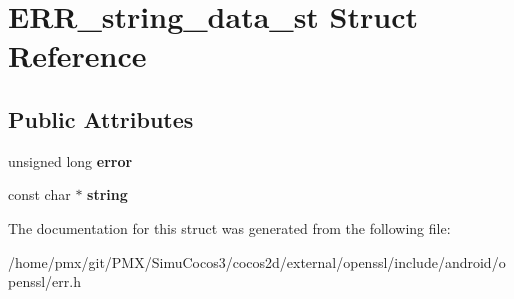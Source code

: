 \hypertarget{structERR__string__data__st}{}\section{E\+R\+R\+\_\+string\+\_\+data\+\_\+st Struct Reference}
\label{structERR__string__data__st}
\subsection*{Public Attributes}
\begin{DoxyCompactItemize}
\item 
\mbox{\label{structERR__string__data__st_a31cec2470a4a78675d42e43bca29eb73}} 
unsigned long {\bfseries error}
\item 
\mbox{\label{structERR__string__data__st_aad4bd1c51575aed5833d784e2944658c}} 
const char $\ast$ {\bfseries string}
\end{DoxyCompactItemize}


The documentation for this struct was generated from the following file\+:\begin{DoxyCompactItemize}
\item 
/home/pmx/git/\+P\+M\+X/\+Simu\+Cocos3/cocos2d/external/openssl/include/android/openssl/err.\+h\end{DoxyCompactItemize}
